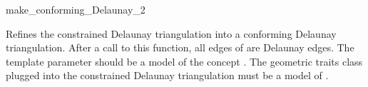 \begin{ccRefFunction}{make_conforming_Delaunay_2}


{ Refines the constrained Delaunay triangulation  into a
  conforming Delaunay triangulation. After a call to this function,
  all edges of  are Delaunay edges.   
  \ccPrecond The template parameter  should be a model of the
  concept .
  The geometric traits class plugged into the constrained Delaunay
  triangulation must be a model of
  .} 

\end{ccRefFunction}

